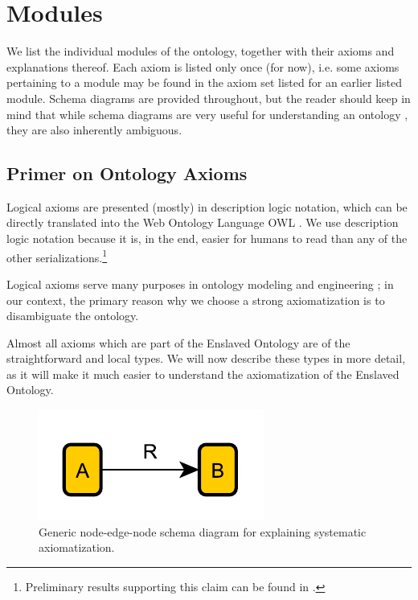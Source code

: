 \chapter{Modules}
\label{sec:mods}
We list the individual modules of the ontology, together with their axioms and explanations thereof. Each axiom is listed only once (for now), i.e. some axioms pertaining to a module may be found in the axiom set listed for an earlier listed module. Schema diagrams are provided throughout, but the reader should keep in mind that while schema diagrams are very useful for understanding an ontology \cite{odp-documentation}, they are also inherently ambiguous.

\section*{Primer on Ontology Axioms}

Logical axioms are presented (mostly) in description logic notation, which can be directly translated into the Web Ontology Language OWL \cite{FOST}. We use description logic notation because it is, in the end, easier for humans to read than any of the other serializations.\footnote{Preliminary results supporting this claim can be found in \cite{ShimizuMS}.} 

Logical axioms serve many purposes in ontology modeling and engineering \cite{HitzlerK16};  in our context, the primary reason why we choose a strong axiomatization is to disambiguate the ontology.

Almost all axioms which are part of the Enslaved Ontology are of the straightforward and local types. We will now describe these types in more detail, as it will make it much easier to understand the axiomatization of the Enslaved Ontology.

\bigskip

\begin{figure}[thb]
\begin{center}
\includegraphics[width=.3\textwidth]{resources/02-ARB}
\caption{Generic node-edge-node schema diagram for explaining systematic axiomatization.}\label{fig:rec-ARB}
\end{center}
\end{figure}

